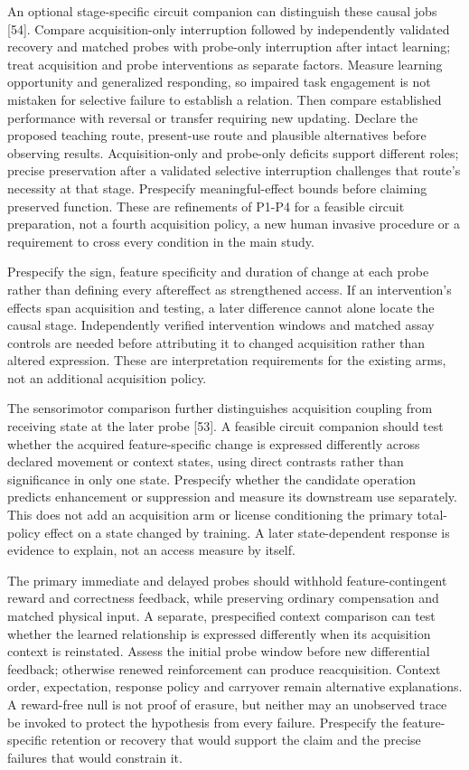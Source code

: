\documentclass[
  american,
  11pt,
  letterpaper,
]{article}
\begin{document}
An optional stage-specific circuit companion can distinguish these causal jobs {[}54{]}. Compare acquisition-only interruption followed by independently validated recovery and matched probes with probe-only interruption after intact learning; treat acquisition and probe interventions as separate factors. Measure learning opportunity and generalized responding, so impaired task engagement is not mistaken for selective failure to establish a relation. Then compare established performance with reversal or transfer requiring new updating. Declare the proposed teaching route, present-use route and plausible alternatives before observing results. Acquisition-only and probe-only deficits support different roles; precise preservation after a validated selective interruption challenges that route's necessity at that stage. Prespecify meaningful-effect bounds before claiming preserved function. These are refinements of P1-P4 for a feasible circuit preparation, not a fourth acquisition policy, a new human invasive procedure or a requirement to cross every condition in the main study.

Prespecify the sign, feature specificity and duration of change at each probe rather than defining every aftereffect as strengthened access. If an intervention's effects span acquisition and testing, a later difference cannot alone locate the causal stage. Independently verified intervention windows and matched assay controls are needed before attributing it to changed acquisition rather than altered expression. These are interpretation requirements for the existing arms, not an additional acquisition policy.

The sensorimotor comparison further distinguishes acquisition coupling from receiving state at the later probe {[}53{]}. A feasible circuit companion should test whether the acquired feature-specific change is expressed differently across declared movement or context states, using direct contrasts rather than significance in only one state. Prespecify whether the candidate operation predicts enhancement or suppression and measure its downstream use separately. This does not add an acquisition arm or license conditioning the primary total-policy effect on a state changed by training. A later state-dependent response is evidence to explain, not an access measure by itself.

The primary immediate and delayed probes should withhold feature-contingent reward and correctness feedback, while preserving ordinary compensation and matched physical input. A separate, prespecified context comparison can test whether the learned relationship is expressed differently when its acquisition context is reinstated. Assess the initial probe window before new differential feedback; otherwise renewed reinforcement can produce reacquisition. Context order, expectation, response policy and carryover remain alternative explanations. A reward-free null is not proof of erasure, but neither may an unobserved trace be invoked to protect the hypothesis from every failure. Prespecify the feature-specific retention or recovery that would support the claim and the precise failures that would constrain it.
\end{document}
